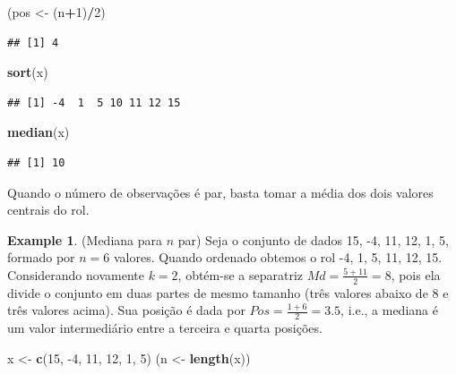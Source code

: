 \documentclass[
]{book}
\newenvironment{Shaded}{\begin{snugshade}}{\end{snugshade}}
\newcommand{\DecValTok}[1]{\textcolor[rgb]{0.00,0.00,0.81}{#1}}
\newcommand{\KeywordTok}[1]{\textcolor[rgb]{0.13,0.29,0.53}{\textbf{#1}}}
\newcommand{\NormalTok}[1]{#1}
\newcommand{\OperatorTok}[1]{\textcolor[rgb]{0.81,0.36,0.00}{\textbf{#1}}}
\newcommand{\StringTok}[1]{\textcolor[rgb]{0.31,0.60,0.02}{#1}}
\theoremstyle{definition}
\theoremstyle{definition}
\newtheorem{example}{Example}[chapter]
\theoremstyle{definition}
\theoremstyle{remark}
\begin{document}
\begin{Shaded}
\begin{Highlighting}[]
\NormalTok{(pos \textless{}{-}}\StringTok{ }\NormalTok{(n}\OperatorTok{+}\DecValTok{1}\NormalTok{)}\OperatorTok{/}\DecValTok{2}\NormalTok{)}
\end{Highlighting}
\end{Shaded}

\begin{verbatim}
## [1] 4
\end{verbatim}

\begin{Shaded}
\begin{Highlighting}[]
\KeywordTok{sort}\NormalTok{(x)}
\end{Highlighting}
\end{Shaded}

\begin{verbatim}
## [1] -4  1  5 10 11 12 15
\end{verbatim}

\begin{Shaded}
\begin{Highlighting}[]
\KeywordTok{median}\NormalTok{(x)}
\end{Highlighting}
\end{Shaded}

\begin{verbatim}
## [1] 10
\end{verbatim}

Quando o número de observações é par, basta tomar a média dos dois valores centrais do rol.

\begin{example}
\protect\hypertarget{exm:mediana-n-par}{}{\label{exm:mediana-n-par} }(Mediana para \(n\) par) Seja o conjunto de dados 15, -4, 11, 12, 1, 5, formado por \(n=6\) valores. Quando ordenado obtemos o rol -4, 1, 5, 11, 12, 15. Considerando novamente \(k=2\), obtém-se a separatriz \(Md=\frac{5+11}{2}=8\), pois ela divide o conjunto em duas partes de mesmo tamanho (três valores abaixo de 8 e três valores acima). Sua posição é dada por \(Pos=\frac{1+6}{2}=3.5\), i.e., a mediana é um valor intermediário entre a terceira e quarta posições.
\end{example}

\begin{Shaded}
\begin{Highlighting}[]
\NormalTok{x \textless{}{-}}\StringTok{ }\KeywordTok{c}\NormalTok{(}\DecValTok{15}\NormalTok{, }\DecValTok{{-}4}\NormalTok{, }\DecValTok{11}\NormalTok{, }\DecValTok{12}\NormalTok{, }\DecValTok{1}\NormalTok{, }\DecValTok{5}\NormalTok{)}
\NormalTok{(n \textless{}{-}}\StringTok{ }\KeywordTok{length}\NormalTok{(x))}
\end{Highlighting}
\end{Shaded}
\end{document}
